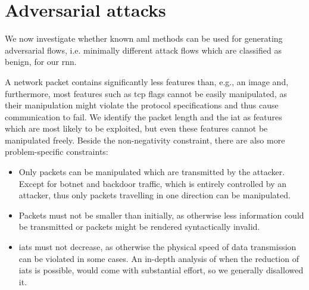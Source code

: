 \documentclass[conference]{IEEEtran}
\begin{document}
\section{Adversarial attacks}
\label{sec:adv}
We now investigate whether known \gls{aml} methods can be used for generating adversarial flows, i.e. minimally different attack flows which are classified as benign, for our \gls{rnn}.

A network packet contains significantly less features than, e.g., an image and, furthermore, most features such as \gls{tcp} flags cannot be easily manipulated, as their manipulation might violate the protocol specifications and thus cause communication to fail. We identify the packet length and the \gls{iat} as features which are most likely to be exploited, but even these features cannot be manipulated freely. Beside the non-negativity constraint,  there are also more problem-specific constraints:
\begin{itemize}[topsep=0pt,wide,labelwidth=!,labelindent=0pt]
\item Only packets can be manipulated which are transmitted by the attacker.
Except for botnet and backdoor traffic, which is entirely controlled by an attacker, thus only packets travelling in one direction can be manipulated.
\item Packets must not be smaller than initially, as otherwise less information could be transmitted or packets might be rendered syntactically invalid.
\item \glspl{iat} must not decrease, as otherwise the physical speed of data transmission can be violated in some cases. An in-depth analysis of when the reduction of \glspl{iat} is possible, would come with substantial effort, so we generally disallowed it. %
\end{itemize}
\end{document}
